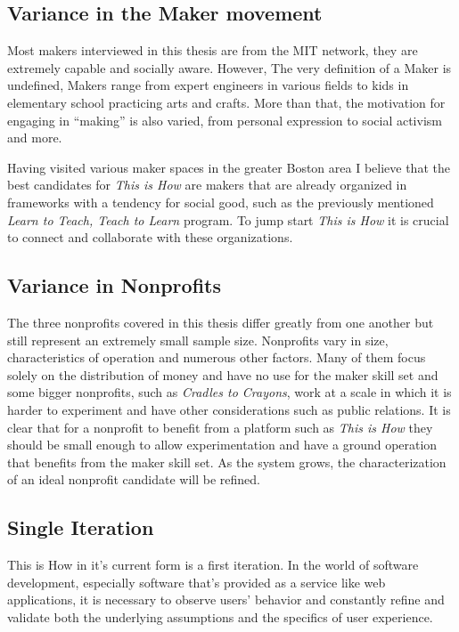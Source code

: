 \subsection{Variance in the Maker movement}

Most makers interviewed in this thesis are from the MIT network, they are extremely capable and socially aware. However, The very definition of a Maker is undefined, Makers range from expert engineers in various fields to kids in elementary school practicing arts and crafts. More than that, the motivation for engaging in ``making'' is also varied, from personal expression to social activism and more. 

Having visited various maker spaces in the greater Boston area I believe that the best candidates for \textit{This is How} are makers that are already organized in frameworks with a tendency for social good, such as the previously mentioned \textit{Learn to Teach, Teach to Learn} program. To jump start \textit{This is How} it is crucial to connect and collaborate with these organizations.

\subsection{Variance in Nonprofits}

The three nonprofits covered in this thesis differ greatly from one another but still represent an extremely small sample size. Nonprofits vary in size, characteristics of operation and numerous other factors. Many of them focus solely on the distribution of money and have no use for the maker skill set and some bigger nonprofits, such as \textit{Cradles to Crayons}, work at a scale in which it is harder to experiment and have other considerations such as public relations.
It is clear that for a nonprofit to benefit from a platform such as \textit{This is How} they should be small enough to allow experimentation and have a ground operation that benefits from the maker skill set. As the system grows, the characterization of an ideal nonprofit candidate will be refined.   

\subsection{Single Iteration} 

This is How in it's current form is a first iteration. In the world of software development, especially software that's provided as a service like web applications, it is necessary to observe users' behavior and constantly refine and validate both the underlying assumptions and the specifics of user experience.

